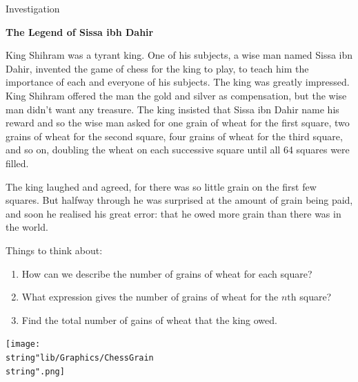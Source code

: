 \documentclass[11pt,a4paper]{book}
\begin{document}
\begin{investigation}[colbacktitle=green]{Investigation}

\hfill \textbf{The Legend of Sissa ibh Dahir}

\bigskip

King Shihram was a tyrant king. One of his subjects, a wise man named
Sissa ibn Dahir, invented the game of chess for the king to play,
to teach him the importance of each and everyone of his subjects.
The king was greatly impressed. King Shihram offered the man the gold
and silver as compensation, but the wise man didn\textquoteright t
want any treasure. The king insisted that Sissa ibn Dahir name his
reward and so the wise man asked for one grain of wheat for the first
square, two grains of wheat for the second square, four grains of
wheat for the third square, and so on, doubling the wheat on each
successive square until all 64 squares were filled.

\medskip{}

The king laughed and agreed, for there was so little grain on the
first few squares. But halfway through he was surprised at the amount
of grain being paid, and soon he realised his great error: that he
owed more grain than there was in the world.

\medskip{}

Things to think about:

\begin{minipage}[t]{0.5\textwidth} 

\medskip{}

\begin{enumerate}[label=(\alph*)]

\item  How can we describe the number of grains of wheat for each square?

\item  What expression gives the number of grains of wheat for the $n\text{th}$ square?

\item  Find the total number of gains of wheat that the king owed.

\end{enumerate}

\end{minipage}
\begin{minipage}[t]{0.5\textwidth} 
\begin{center}
\texttt{[image: \\string"lib/Graphics/ChessGrain\\string".png]}
\par\end{center}
\end{minipage}

\end{investigation}
\end{document}
